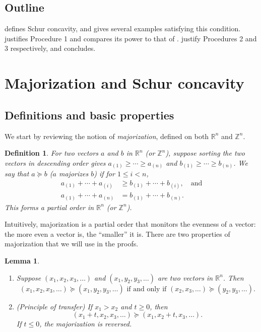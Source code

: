 \documentclass[aos, authoryear]{imsart}
\newtheorem{definition}{Definition}
\newtheorem{lemma}[corollary]{Lemma}
\theoremstyle{definition}
\theoremstyle{custom}
\newcommand{\RR}{\mathbb{R}}
\newcommand{\ZZ}{\mathbb{Z}}
\begin{document}
\subsection{Outline}

 defines Schur concavity, and gives several examples satisfying this condition.  justifies Procedure 1 and compares its power to that of \citet{Gupta:1967wg}.  justify Procedures 2 and 3 respectively, and  concludes.

\section{Majorization and Schur concavity}
\label{sec:maj}

\subsection{Definitions and basic properties}

We start by reviewing the notion of {\em majorization}, defined on both $\RR^n$ and $\ZZ^n$.

\begin{definition}
For two vectors $a$ and $b$ in $\RR^n$ (or $\ZZ^n$), suppose sorting the two vectors in descending order gives
$a_{\left(1\right)} \ge \cdots \ge a_{\left(n\right)}$ and $b_{\left(1\right)} \ge \cdots \ge b_{\left(n\right)}$. We say that $a \succeq b$ ($a$ majorizes $b$) if for $1 \le i < n$,
\begin{align*}
a_{\left(1\right)} + \cdots + a_{\left(i\right)} & \ge b_{\left(1\right)} + \cdots + b_{\left(i\right)}, \quad \text{and}\\
a_{\left(1\right)} + \cdots + a_{\left(n\right)} & = b_{\left(1\right)} + \cdots + b_{\left(n\right)}.
\end{align*}
This forms a partial order in $\RR^n$ (or $\ZZ^n$).
\end{definition}

Intuitively, majorization is a partial order that monitors the evenness of a vector: the more even a vector is, the ``smaller'' it is. There are two properties of majorization that we will use in the proofs.

\begin{lemma}\leavevmode
\label{lma:twoprop}
\begin{enumerate}
\item Suppose $\left(x_1, x_2, x_3, \ldots\right)$ and $\left(x_1, y_2, y_3, \ldots\right)$ are two vectors in $\RR^n$. Then
\[\left(x_1, x_2, x_3, \ldots\right) \succeq \left(x_1, y_2, y_3, \ldots\right) \text{ if and only if } \left(x_2, x_3, \ldots\right) \succeq \left(y_2, y_3, \ldots\right).\]
\item (Principle of transfer) If $x_1 > x_2$ and $t \ge 0$, then
\[\left(x_1 + t, x_2, x_3, \ldots\right) \succeq \left(x_1, x_2 + t, x_3, \ldots\right).\]
If $t \le 0$, the majorization is reversed.
\end{enumerate}
\end{lemma}
\end{document}

